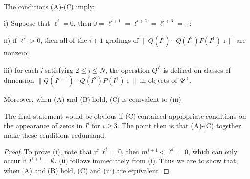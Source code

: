 \documentclass[11pt]{article}
\newcommand{\nontop}[1]{\scrU^{#1}}%
\renewcommand{\Q}{Q}
\newcommand{\minDim}{m}
\begin{document}
\begin{CalculatingRepeatedKoszul}
\begin{lem*}
The conditions (A)-(C) imply:
\begin{itemise}
\item[i)] Suppose that $\ell^i=0$, then $0=\ell^{i+1}=\ell^{i+2}=\ell^{i+3}=\cdots $;
\item[ii)] if $\ell^i>0$, then all of the $i+1$ gradings of $\|\Q(I^{i})\cdots \Q(I^2)P(I^1)\imath\|$ are nonzero;%
\item[iii)] for each $i$ satisfying $2\leq i\leq N$, the operation $\Q^{I^i}$ is defined on classes of dimension $\|\Q(I^{i-1})\cdots \Q(I^2)P(I^1)\imath\|$ in objects of $\nontop{i}$.
\end{itemise}
Moreover, when (A) and (B) hold, (C) is equivalent to (iii).
\end{lem*}
\noindent The final statement would be obvious if (C) contained appropriate conditions on the appearance of zeros in $I^i$ for $i\geq3$. The point then is that (A)-(C) together make these conditions redundand.
%
%

\begin{proof}
To prove (i), note that if $\ell^i=0$, then $\minDim^{i+1}<\ell^i=0$, which can only occur if $I^{i+1}=\emptyset$. (ii) follows immediately from (i). Thus we are to show that, when (A) and (B) hold, (C) and (iii) are equivalent.


\end{proof}
\end{CalculatingRepeatedKoszul}
\end{document}
